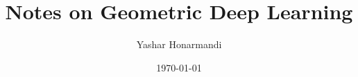 \documentclass[a4paper, 11pt]{article}
\title{Notes on Geometric Deep Learning}
\author{Yashar Honarmandi}
\date{\today}
\begin{document}
\maketitle

\begin{abstract}
	
\end{abstract}

\thispagestyle{empty}

\newpage

\tableofcontents

\newpage



\end{document}
